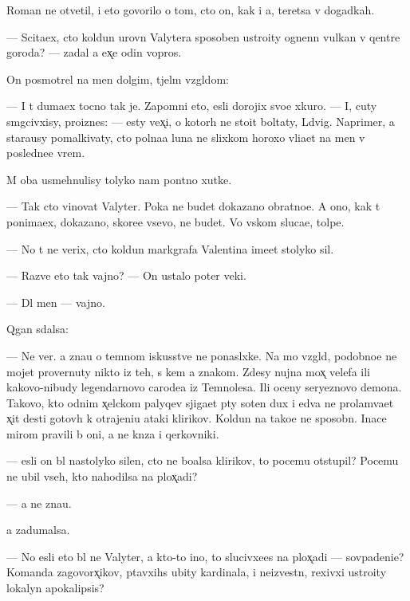 \documentclass[10pt]{book}
\begin{document}
Roman ne otvetil, i eto govorilo o tom, cto on, kak i {\y}a, ter{\ia}{\y}etsa v dogadkah.

— Scita{\y}ex, cto koldun urovn{\ia} Valytera sposoben ustro{\y}ity ognenn{\yi}{\y} vulkan v qentre goroda? — zadal {\y}a {\y}ex̨e odin vopros.

On posmotrel na men{\ia} dolgim, t{\ia}jel{\yi}m vzgl{\ia}dom:

— I t{\yi} duma{\y}ex tocno tak je. Zapomni eto, {\y}esli dorojix svo{\y}e{\y} xkuro{\y}. — I, cuty sm{\ia}gcivxisy, pro{\y}iznes: — {\Y}esty vex̨i, o kotor{\yi}h ne sto{\y}it boltaty, L{\iu}dvig. Naprimer, {\y}a stara{\y}usy pomalkivaty, cto polna{\y}a luna ne slixkom horoxo vli{\y}a{\y}et na men{\ia} v posledne{\y}e vrem{\ia}.

M{\yi} oba usmehnulisy tolyko nam pon{\ia}tno{\y} xutke.

— Tak cto vinovat Valyter. Poka ne budet dokazano obratno{\y}e. A ono, kak t{\yi} ponima{\y}ex, dokazano, skore{\y}e vsevo, ne budet. Vo vs{\ia}kom sluca{\y}e, tolpe.

— No t{\yi} ne verix, cto koldun markgrafa Valentina ime{\y}et stolyko sil.

— Razve eto tak vajno? — On ustalo poter veki.

— Dl{\ia} men{\ia} — vajno.

Q{\yi}gan sdalsa:

— Ne ver{\iu}. {\Y}a zna{\y}u o temnom iskusstve ne ponasl{\yi}xke. Na mo{\y} vzgl{\ia}d, podobno{\y}e ne mojet provernuty nikto iz teh, s kem {\y}a znakom. Zdesy nujna mox̨ velefa ili kakovo-nibudy legendarnovo carode{\y}a iz Temnoles{\y}a. Ili oceny seryeznovo demona. Takovo, kto odnim x̨elckom palyqev sjiga{\y}et p{\ia}ty soten dux i {\y}edva ne prolam{\yi}va{\y}et x̨it des{\ia}ti gotov{\yi}h k otrajeni{\y}u ataki klirikov. Koldun{\yi} na tako{\y}e ne sposobn{\yi}. Inace mirom pravili b{\yi} oni, a ne kn{\ia}z{\y}a i qerkovniki.

— {\Y}esli on b{\yi}l nastolyko silen, cto ne bo{\y}alsa klirikov, to pocemu otstupil? Pocemu ne ubil vseh, kto nahodilsa na plox̨adi?

— {\Y}a ne zna{\y}u.

{\Y}a zadumalsa.

— No {\y}esli eto b{\yi}l ne Valyter, a kto-to ino{\y}, to slucivxe{\y}es{\ia} na plox̨adi — sovpadeni{\y}e? Komanda zagovorx̨ikov, p{\yi}tavxihs{\ia} ubity kardinala, i ne{\y}izvestn{\yi}{\y}, rexivxi{\y} ustro{\y}ity lokalyn{\yi}{\y} apokalipsis?
\end{document}
